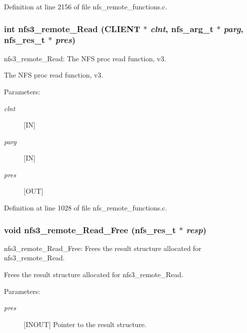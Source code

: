 Definition at line 2156 of file nfs\_\-remote\_\-functions.c.
\subsubsection[{nfs3\_\-remote\_\-Read}]{\setlength{\rightskip}{0pt plus 5cm}int nfs3\_\-remote\_\-Read (CLIENT $\ast$ {\em clnt}, \/  nfs\_\-arg\_\-t $\ast$ {\em parg}, \/  nfs\_\-res\_\-t $\ast$ {\em pres})}\label{group__NFSprocs_g8de1a9ff512d9bc09985d1510b5ab7ab}


nfs3\_\-remote\_\-Read: The NFS proc read function, v3.

The NFS proc read function, v3.

\begin{Desc}
\item[Parameters:]
\begin{description}
\item[{\em clnt}][IN] \item[{\em parg}][IN] \item[{\em pres}][OUT] \end{description}
\end{Desc}


Definition at line 1028 of file nfs\_\-remote\_\-functions.c.
\subsubsection[{nfs3\_\-remote\_\-Read\_\-Free}]{\setlength{\rightskip}{0pt plus 5cm}void nfs3\_\-remote\_\-Read\_\-Free (nfs\_\-res\_\-t $\ast$ {\em resp})}\label{group__NFSprocs_g5d054fdd8a7ec49bfd90085936faffb2}


nfs3\_\-remote\_\-Read\_\-Free: Frees the result structure allocated for nfs3\_\-remote\_\-Read.

Frees the result structure allocated for nfs3\_\-remote\_\-Read.

\begin{Desc}
\item[Parameters:]
\begin{description}
\item[{\em pres}][INOUT] Pointer to the result structure. \end{description}
\end{Desc}


